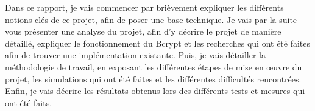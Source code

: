 
Dans ce rapport, je vais commencer par brièvement expliquer les différents notions clés de ce projet, afin de poser une base technique. Je vais par la suite vous présenter une analyse du projet, afin d'y décrire le projet de manière détaillé, expliquer le fonctionnement du Bcrypt et les recherches qui ont été faites afin de trouver une implémentation existante. Puis, je vais détailler la méthodologie de travail, en exposant les différentes étapes de mise en œuvre du projet, les simulations qui ont été faites et les différentes difficultés rencontrées. Enfin, je vais décrire les résultats obtenus lors des différents tests et mesures qui ont été faits.
